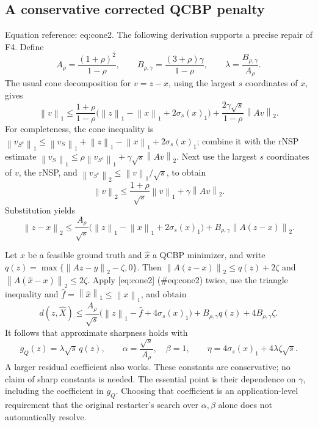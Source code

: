\documentclass[10pt]{article}
\begin{document}
\subsection*{A conservative corrected QCBP penalty}
Equation reference: eq:cone2. The following derivation supports a precise repair of F4. Define \[A_\rho=\frac{(1+\rho)^2}{1-\rho},\qquad
 B_{\rho,\gamma}=\frac{(3+\rho)\gamma}{1-\rho},\qquad
 \lambda=\frac{B_{\rho,\gamma}}{A_\rho}.\] The usual cone decomposition for \(v=z-x\), using the largest \(s\) coordinates of \(x\), gives \[\left\lVert v\right\rVert_1\le
 \frac{1+\rho}{1-\rho}
 \bigl(\left\lVert z\right\rVert_1-\left\lVert x\right\rVert_1+2\sigma_s(x)_1\bigr)
 +\frac{2\gamma\sqrt{s}}{1-\rho}\left\lVert Av\right\rVert_2.\] For completeness, the cone inequality is \(\left\lVert v_{S^c}\right\rVert_1\le\left\lVert v_S\right\rVert_1+\left\lVert z\right\rVert_1-\left\lVert x\right\rVert_1+2\sigma_s(x)_1\); combine it with the rNSP estimate \(\left\lVert v_S\right\rVert_1\le\rho\left\lVert v_{S^c}\right\rVert_1+\gamma\sqrt{s}\left\lVert Av\right\rVert_2\). Next use the largest \(s\) coordinates of \(v\), the rNSP, and \(\left\lVert v_{S^c}\right\rVert_2\le\left\lVert v\right\rVert_1/\sqrt{s}\), to obtain \[\left\lVert v\right\rVert_2\le\frac{1+\rho}{\sqrt{s}}\left\lVert v\right\rVert_1+\gamma\left\lVert Av\right\rVert_2.\] Substitution yields \[
 \left\lVert z-x\right\rVert_2\le
 \frac{A_\rho}{\sqrt{s}}
 \bigl(\left\lVert z\right\rVert_1-\left\lVert x\right\rVert_1+2\sigma_s(x)_1\bigr)
 +B_{\rho,\gamma}\left\lVert A(z-x)\right\rVert_2.\]\par
Let \(x\) be a feasible ground truth and \(\widehat x\) a QCBP minimizer, and write \(q(z)=\max\{\left\lVert Az-y\right\rVert_2-\zeta,0\}\). Then \(\left\lVert A(z-x)\right\rVert_2\le q(z)+2\zeta\) and \(\left\lVert A(\widehat x-x)\right\rVert_2\le2\zeta\). Apply [eq:cone2] (\#eq:cone2) twice, use the triangle inequality and \(\widehat f=\left\lVert \widehat x\right\rVert_1\le\left\lVert x\right\rVert_1\), and obtain \[d(z,\widehat X)\le
 \frac{A_\rho}{\sqrt{s}}
 \bigl(\left\lVert z\right\rVert_1-\widehat f+4\sigma_s(x)_1\bigr)
 +B_{\rho,\gamma}q(z)+4B_{\rho,\gamma}\zeta .\] It follows that approximate sharpness holds with \[g_Q(z)=\lambda\sqrt{s}\,q(z),\qquad
 \alpha=\frac{\sqrt{s}}{A_\rho},\quad \beta=1,\qquad
 \eta=4\sigma_s(x)_1+4\lambda\zeta\sqrt{s}.\] A larger residual coefficient also works. These constants are conservative; no claim of sharp constants is needed. The essential point is their dependence on \(\gamma\), including the coefficient in \(g_Q\). Choosing that coefficient is an application-level requirement that the original restarter’s search over \(\alpha,\beta\) alone does not automatically resolve.\par
\end{document}
